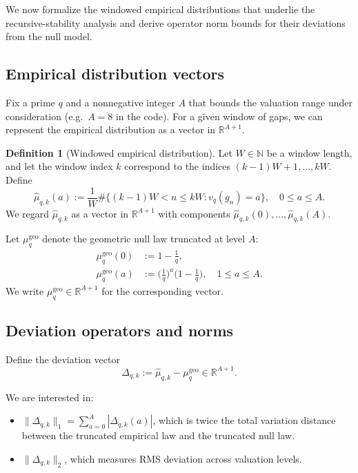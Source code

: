 \documentclass[11pt]{article}
\theoremstyle{definition}
\newtheorem{definition}{Definition}[section]
\theoremstyle{plain}
\theoremstyle{remark}
\newcommand{\1}{\mathbb{1}}
\begin{document}
We now formalize the windowed empirical distributions that underlie the recursive-stability analysis and derive operator norm bounds for their deviations from the null model.

\subsection{Empirical distribution vectors}

Fix a prime \(q\) and a nonnegative integer \(A\) that bounds the valuation range under consideration (e.g.\ \(A=8\) in the code). For a given window of gaps, we can represent the empirical distribution as a vector in \(\mathbb{R}^{A+1}\).

\begin{definition}[Windowed empirical distribution]
Let \(W\in\mathbb{N}\) be a window length, and let the window index \(k\) correspond to the indices \((k-1)W+1,\dots,kW\). Define
\[
  \hat{\mu}_{q,k}(a) := \frac{1}{W}\#\{(k-1)W < n \le kW : v_q(g_n) = a\},\quad 0\le a\le A.
\]
We regard \(\hat{\mu}_{q,k}\) as a vector in \(\mathbb{R}^{A+1}\) with components \(\hat{\mu}_{q,k}(0),\dots,\hat{\mu}_{q,k}(A)\).
\end{definition}

Let \(\mu_q^{\mathrm{geo}}\) denote the geometric null law truncated at level \(A\):
\begin{align*}
  \mu_q^{\mathrm{geo}}(0) &:= 1 - \frac{1}{q},\\
  \mu_q^{\mathrm{geo}}(a) &:= \bigg(\frac{1}{q}\bigg)^a\bigg(1-\frac{1}{q}\bigg),\quad 1\le a\le A.
\end{align*}
We write \(\mu_q^{\mathrm{geo}}\in\mathbb{R}^{A+1}\) for the corresponding vector.

\subsection{Deviation operators and norms}

Define the deviation vector
\[
  \Delta_{q,k} := \hat{\mu}_{q,k} - \mu_q^{\mathrm{geo}} \in \mathbb{R}^{A+1}.
\]

We are interested in:

\begin{itemize}[leftmargin=*]
  \item \(\|\Delta_{q,k}\|_1 = \sum_{a=0}^A |\Delta_{q,k}(a)|\), which is twice the total variation distance between the truncated empirical law and the truncated null law.
  \item \(\|\Delta_{q,k}\|_2\), which measures RMS deviation across valuation levels.
\end{itemize}
\end{document}
